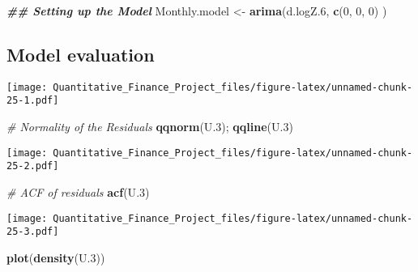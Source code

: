 \documentclass[
]{article}
\newenvironment{Shaded}{\begin{snugshade}}{\end{snugshade}}
\newcommand{\CommentTok}[1]{\textcolor[rgb]{0.56,0.35,0.01}{\textit{#1}}}
\newcommand{\DecValTok}[1]{\textcolor[rgb]{0.00,0.00,0.81}{#1}}
\newcommand{\DocumentationTok}[1]{\textcolor[rgb]{0.56,0.35,0.01}{\textbf{\textit{#1}}}}
\newcommand{\FloatTok}[1]{\textcolor[rgb]{0.00,0.00,0.81}{#1}}
\newcommand{\FunctionTok}[1]{\textcolor[rgb]{0.13,0.29,0.53}{\textbf{#1}}}
\newcommand{\NormalTok}[1]{#1}
\newcommand{\OtherTok}[1]{\textcolor[rgb]{0.56,0.35,0.01}{#1}}
\newcommand{\SpecialCharTok}[1]{\textcolor[rgb]{0.81,0.36,0.00}{\textbf{#1}}}
\begin{document}
\begin{Shaded}
\begin{Highlighting}[]
\DocumentationTok{\#\# Setting up the Model}
\NormalTok{Monthly.model }\OtherTok{\textless{}{-}} \FunctionTok{arima}\NormalTok{(d.logZ}\FloatTok{.6}\NormalTok{, }\FunctionTok{c}\NormalTok{(}\DecValTok{0}\NormalTok{, }\DecValTok{0}\NormalTok{, }\DecValTok{0}\NormalTok{) )}
\end{Highlighting}
\end{Shaded}

\hypertarget{model-evaluation-2}{%
\subsection{Model evaluation}\label{model-evaluation-2}}

\begin{Shaded}
\end{Shaded}

\texttt{[image: Quantitative\_Finance\_Project\_files/figure-latex/unnamed-chunk-25-1.pdf]}

\begin{Shaded}
\begin{Highlighting}[]
\CommentTok{\# Normality of the Residuals}
\FunctionTok{qqnorm}\NormalTok{(U}\FloatTok{.3}\NormalTok{); }\FunctionTok{qqline}\NormalTok{(U}\FloatTok{.3}\NormalTok{)}
\end{Highlighting}
\end{Shaded}

\texttt{[image: Quantitative\_Finance\_Project\_files/figure-latex/unnamed-chunk-25-2.pdf]}

\begin{Shaded}
\begin{Highlighting}[]
\CommentTok{\# ACF of residuals}
\FunctionTok{acf}\NormalTok{(U}\FloatTok{.3}\NormalTok{)}
\end{Highlighting}
\end{Shaded}

\texttt{[image: Quantitative\_Finance\_Project\_files/figure-latex/unnamed-chunk-25-3.pdf]}

\begin{Shaded}
\begin{Highlighting}[]
\FunctionTok{plot}\NormalTok{(}\FunctionTok{density}\NormalTok{(U}\FloatTok{.3}\NormalTok{))}
\end{Highlighting}
\end{Shaded}
\end{document}
